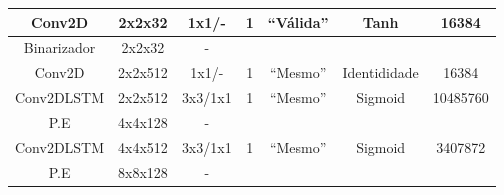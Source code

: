 \begin{table}[htbp]
\begin{adjustbox}{width=\columnwidth,center}
\begin{tabular}{|c|c|c|c|c|c|c|}
			Conv2D          & 2x2x32                                                               & 1x1/-                                                                                   & 1              & ``Válida''                  & Tanh                                                                  & 16384                                                                   \\ \hline
			Binarizador     & 2x2x32                                                               & -                                                                                       &                &                        &                                                                       &                                                                         \\ \hline
			Conv2D          & 2x2x512                                                              & 1x1/-                                                                                   & 1              & ``Mesmo''                   & Identididade                                                          & 16384                                                                   \\ \hline
			Conv2DLSTM      & 2x2x512                                                              & 3x3/1x1                                                                                 & 1              & ``Mesmo''                   & Sigmoid                                                               & 10485760                                                                \\ \hline
			P.E             & 4x4x128                                                              & -                                                                                       &                &                        &                                                                       &                                                                         \\ \hline
			Conv2DLSTM      & 4x4x512                                                              & 3x3/1x1                                                                                 & 1              & ``Mesmo''                   & Sigmoid                                                               & 3407872                                                                 \\ \hline
			P.E             & 8x8x128                                                              & -                                                                                       &                &                        &                                                                       &                                                                         \\ \hline

\end{tabular}
\end{adjustbox}
\end{table}
